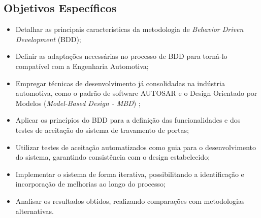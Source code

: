\subsection{Objetivos Específicos}
\begin{itemize}
    \item Detalhar as principais características da metodologia de \textit{Behavior Driven Development} (BDD);
    \item Definir as adaptações necessárias no processo de BDD para torná-lo compatível com a Engenharia Automotiva;
    \item Empregar técnicas de desenvolvimento já consolidadas na indústria automotiva, como o padrão de software AUTOSAR \cite{autosarClassic} e o Design Orientado por Modelos (\textit{Model-Based Design - MBD}) \cite{mathworksMBD2024};
    \item Aplicar os princípios do BDD para a definição das funcionalidades e dos testes de aceitação do sistema de travamento de portas;
    \item Utilizar testes de aceitação automatizados como guia para o desenvolvimento do sistema, garantindo consistência com o design estabelecido;
    \item Implementar o sistema de forma iterativa, possibilitando a identificação e incorporação de melhorias ao longo do processo;
    \item Analisar os resultados obtidos, realizando comparações com metodologias alternativas.
\end{itemize}




